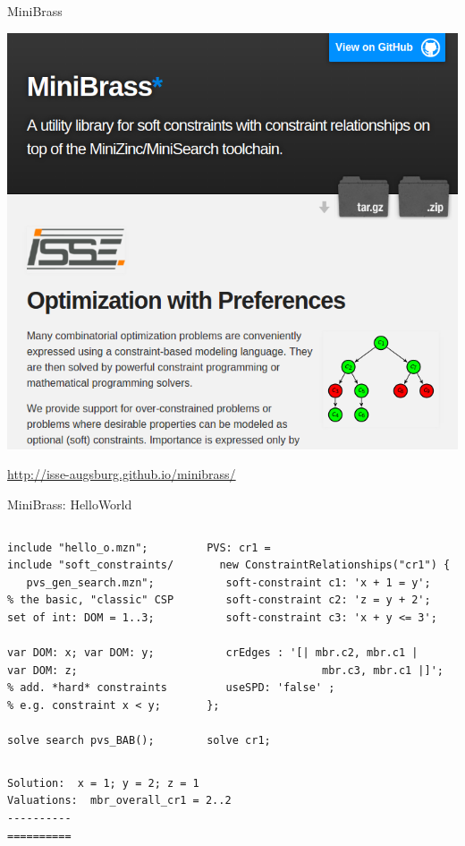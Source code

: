 \documentclass[handout,10pt,xcolor={dvipsnames},fleqn]{beamer}
\begin{document}
\begin{frame}[fragile]{MiniBrass}

\begin{center}

\includegraphics[width=.5\textwidth]{img/minibrass.png}

\vspace*{2ex}

\url{http://isse-augsburg.github.io/minibrass/}

\end{center}

\end{frame}

\begin{frame}[fragile]{MiniBrass: HelloWorld}
\begin{columns}[onlytextwidth,T]
    
    \begin{column}{.40\textwidth}
          
    \begin{lstlisting}
include "hello_o.mzn"; 
include "soft_constraints/
   pvs_gen_search.mzn"; 
% the basic, "classic" CSP 
set of int: DOM = 1..3;

var DOM: x; var DOM: y; 
var DOM: z;
% add. *hard* constraints
% e.g. constraint x < y;

solve search pvs_BAB();
\end{lstlisting}
    \end{column}
    
    \begin{column}{.55\textwidth}
  	\begin{lstlisting}
PVS: cr1 = 
  new ConstraintRelationships("cr1") {
   soft-constraint c1: 'x + 1 = y';
   soft-constraint c2: 'z = y + 2';
   soft-constraint c3: 'x + y <= 3';
   
   crEdges : '[| mbr.c2, mbr.c1 | 
                  mbr.c3, mbr.c1 |]';
   useSPD: 'false' ;
}; 

solve cr1;
\end{lstlisting}

    \end{column}
  \end{columns}
  \pause
  \begin{verbatim}
Solution:  x = 1; y = 2; z = 1
Valuations:  mbr_overall_cr1 = 2..2
----------
==========
  \end{verbatim}
\end{frame}
\end{document}
